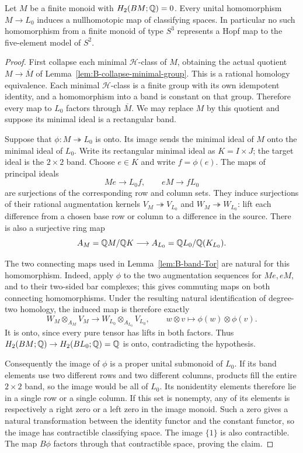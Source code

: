 \begin{proposition}
\label{C:aperiodic-Hopf-target}
\label{C:literal-Hopf-target}
Let $M$ be a finite monoid with $H_2(BM;\mathbb Q)=0$.
Every unital homomorphism $M\to L_0$ induces a nullhomotopic map
of classifying spaces. In particular no such homomorphism from
a finite monoid of type $S^3$ represents a Hopf map to the
five-element model of $S^2$.
\end{proposition}
\begin{proof}
First collapse each minimal $\mathcal H$-class of $M$, obtaining
the actual quotient $M\to\overline M$ of
Lemma~\ref{lem:B-collapse-minimal-group}. This is a rational
homology equivalence. Each minimal $\mathcal H$-class is a finite
group with its own idempotent identity, and a homomorphism into a
band is constant on that group. Therefore every map to $L_0$
factors through $\overline M$. We may replace $M$ by this quotient
and suppose its minimal ideal is a rectangular band.

Suppose that $\phi:M\twoheadrightarrow L_0$ is onto.
Its image sends the minimal ideal of $M$ onto the minimal ideal
of $L_0$. Write its rectangular minimal ideal as $K=I\times J$;
the target ideal is the
$2\times2$ band. Choose $e\in K$ and write $f=\phi(e)$.
The maps of principal ideals
\[
 Me\longrightarrow L_0f,\qquad eM\longrightarrow fL_0
\]
are surjections of the corresponding row and column sets.
They induce surjections of their rational augmentation kernels
$V_M\twoheadrightarrow V_{L_0}$ and
$W_M\twoheadrightarrow W_{L_0}$: lift each difference from a
chosen base row or column to a difference in the source.
There is also a surjective ring map
\[
 A_M=\mathbb Q M/\mathbb Q K\longrightarrow
 A_{L_0}=\mathbb Q L_0/\mathbb Q(K_{L_0}).
\]

The two connecting maps used in Lemma~\ref{lem:B-band-Tor}
are natural for this homomorphism. Indeed, apply $\phi$ to
the two augmentation sequences for $Me,eM$, and to their
two-sided bar complexes; this gives commuting maps on both
connecting homomorphisms. Under the resulting natural
identification of degree-two homology, the induced map is
therefore exactly
\[
 W_M\otimes_{A_M}V_M\longrightarrow
 W_{L_0}\otimes_{A_{L_0}}V_{L_0},
 \qquad w\otimes v\longmapsto\phi(w)\otimes\phi(v).
\]
It is onto, since every pure tensor has lifts in both factors.
Thus $H_2(BM;\mathbb Q)\to H_2(BL_0;\mathbb Q)=\mathbb Q$ is onto, contradicting
the hypothesis.

Consequently the image of $\phi$ is a proper unital submonoid
of $L_0$. If its band elements use two different rows and two
different columns, products fill the entire $2\times2$ band,
so the image would be all of $L_0$. Its nonidentity elements
therefore lie in a single row or a single column. If this set
is nonempty, any of its elements is respectively a right zero
or a left zero in the image monoid. Such a zero gives a natural
transformation between the identity functor and the constant
functor, so the image has contractible classifying space.
The image $\{1\}$ is also contractible. The map $B\phi$
factors through that contractible space, proving the claim.
\end{proof}

